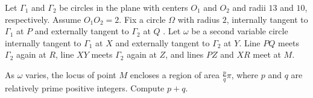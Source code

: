 Let $\Gamma_1$ and $\Gamma_2$ be circles in the plane with centers $O_1$ and $O_2$ and radii $13$ and $10$, respectively. Assume $O_1O_2=2$.  Fix a circle $\Omega$ with radius $2$, internally tangent to $\Gamma_1$ at $P$ and externally tangent to $\Gamma_2$ at $Q$ . Let $\omega$ be a second variable circle internally tangent to $\Gamma_1$ at $X$ and externally tangent to $\Gamma_2$ at $Y$.  Line $PQ$ meets $\Gamma_2$ again at $R$, line $XY$ meets $\Gamma_2$ again at $Z$, and lines $PZ$ and $XR$ meet at $M$.

As $\omega$ varies, the locus of point $M$ encloses a region of area $\frac{p}{q} \pi$, where $p$ and $q$ are relatively prime positive integers.  Compute $p+q$.
